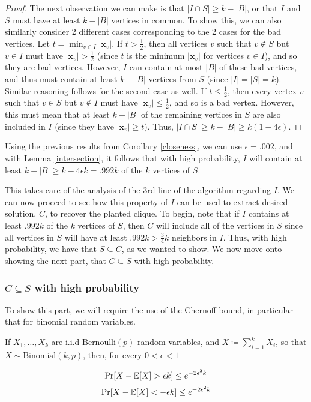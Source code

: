\documentclass{article}
\begin{document}
\begin{proof}
    The next observation we can make is that $|I \cap S| \geq k - |B|$, or that $I$ and $S$ must have at least $k
    - |B|$ vertices in common. To show this, we can also similarly consider 2 different cases
    corresponding to the 2 cases for the bad vertices. Let $t = \min_{v \in I}
    |\mathbf{x}_{v}|$. If $t > \frac{1}{2}$, then all vertices $v$ such that $v \notin
    S$ but $v \in I$ must have $|\mathbf{x}_{v}| > \frac{1}{2}$ (since $t$ is the
    minimum $|\mathbf{x}_{v}|$ for vertices $v \in I$), and so they are bad vertices.
    However, $I$ can contain at most $|B|$ of these bad vertices, and thus must
    contain at least $k - |B|$ vertices from $S$ (since $|I| = |S| = k$).
    Similar reasoning follows for the second case as well. If $t \leq
    \frac{1}{2}$, then every vertex $v$ such that $v \in S$ but $v \notin I$
    must have $|\mathbf{x}_{v}| \leq \frac{1}{2}$, and so is a bad vertex. However, this
    must mean that at least $k - |B|$ of the remaining vertices in $S$ are also
    included in $I$ (since they have $|\mathbf{x}_v| \geq t$). Thus, $|I \cap S| \geq k
    - |B| \geq k(1 - 4\epsilon)$.
\end{proof}

Using the previous results from Corollary \ref{closeness}, we can use
$\epsilon = .002$, and with Lemma \ref{intersection}, it follows that with
high probability, $I$
will contain at least $k - |B| \geq k - 4 \epsilon k = .992k$ of the $k$
vertices of $S$.

This takes care of the analysis of the 3rd line of the
algorithm regarding $I$. We can now proceed to see how this property of $I$ can be
used to extract desired solution, $C$, to recover the planted clique. To begin,
note that if $I$ contains at least $.992k$ of the $k$ vertices of $S$, then $C$
will include all of the vertices in $S$ since all vertices in $S$ will have at least
$.992k > \frac{3}{4}k$ neighbors in $I$. Thus, with high probability, we have
that $S
\subseteq C$, as we wanted to show. We now move onto showing the next part,
that $C \subseteq S$ with high probability.

\subsubsection{$C \subseteq S$ with high probability}
To show this part, we will require the use of the Chernoff bound, in
particular that for binomial random variables.

\begin{theorem}
    \label{Chernoff}
    If $X_{1}, \ldots, X_{k}$ are i.i.d $\text{Bernoulli}(p)$ random variables,
    and $X \coloneqq \sum_{i = 1}^{k} X_{i}$, so that $X \sim
    \text{Binomial}(k, p)$, then, for every $0 < \epsilon < 1$

    $$\Pr[X - \operatorname{\mathbb{E}}[X] > \epsilon k] \leq e^{-2 \epsilon^{2} k}$$
    $$\Pr[X - \operatorname{\mathbb{E}}[X] < -\epsilon k] \leq e^{-2 \epsilon^{2} k}$$
\end{theorem}
\end{document}
